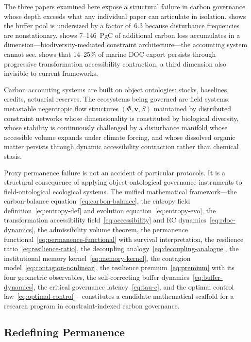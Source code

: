 \documentclass[12pt]{article}
\begin{document}
The three papers examined here expose a structural failure in carbon governance whose depth
exceeds what any individual paper can articulate in isolation. \citet{Wu2026} shows the
buffer pool is undersized by a factor of~6.3 because disturbance frequencies are
nonstationary. \citet{Weiskopf2024} shows 7--146~PgC of additional carbon loss accumulates
in a dimension---biodiversity-mediated constraint architecture---the accounting system
cannot see. \citet{Watanabe2026} shows that 14--25\% of marine DOC export persists through
progressive transformation accessibility contraction, a third dimension also invisible to
current frameworks.

Carbon accounting systems are built on object ontologies: stocks, baselines, credits,
actuarial reserves. The ecosystems being governed are field systems:
metastable negentropic flow structures $(\Phi,\mathbf{v},S)$ maintained by distributed
constraint networks whose dimensionality is constituted by biological diversity, whose
stability is continuously challenged by a disturbance manifold whose accessible volume
expands under climate forcing, and whose dissolved organic matter persists through dynamic
accessibility contraction rather than chemical stasis.

Proxy permanence failure is not an accident of particular protocols. It is a structural
consequence of applying object-ontological governance instruments to field-ontological
ecological systems. The unified mathematical framework---the carbon-balance
equation~\eqref{eq:carbon-balance}, the entropy field definition~\eqref{eq:entropy-def}
and evolution equation~\eqref{eq:entropy-evo}, the transformation accessibility
field~\eqref{eq:accessibility} and RC dynamics~\eqref{eq:rdoc-dynamics}, the admissibility
volume theorem, the permanence functional~\eqref{eq:permanence-functional} with survival
interpretation, the resilience ratio~\eqref{eq:resilience-ratio}, the decoupling
analogy~\eqref{eq:decoupling-analogue}, the institutional memory
kernel~\eqref{eq:memory-kernel}, the contagion model~\eqref{eq:contagion-nonlinear},
the resilience premium~\eqref{eq:premium} with its four geometric observables, the
self-correcting buffer dynamics~\eqref{eq:buffer-dynamics}, the critical governance
latency~\eqref{eq:tau-c}, and the optimal control law~\eqref{eq:optimal-control}---constitutes
a candidate mathematical scaffold for a research program in constraint-indexed carbon
governance.

\subsection*{Redefining Permanence}
\end{document}
